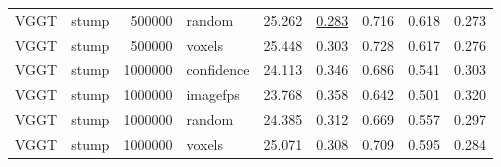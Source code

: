 \begin{table}[H]
\begin{tabular}{llrlrrrrr}
VGGT & stump & 500000 & random & 25.262 & \underline{0.283} & 0.716 & 0.618 & 0.273 \\
VGGT & stump & 500000 & voxels & 25.448 & 0.303 & 0.728 & 0.617 & 0.276 \\
VGGT & stump & 1000000 & confidence & 24.113 & 0.346 & 0.686 & 0.541 & 0.303 \\
VGGT & stump & 1000000 & imagefps & 23.768 & 0.358 & 0.642 & 0.501 & 0.320 \\
VGGT & stump & 1000000 & random & 24.385 & 0.312 & 0.669 & 0.557 & 0.297 \\
VGGT & stump & 1000000 & voxels & 25.071 & 0.308 & 0.709 & 0.595 & 0.284 \\
\bottomrule
\end{tabular}
\end{table}